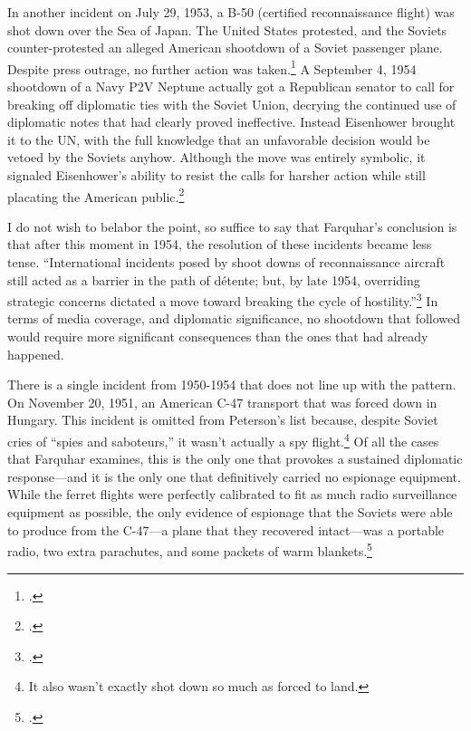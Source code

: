 \documentclass[12pt]{article}
\begin{document}
In another incident on July 29, 1953, a B-50 (certified reconnaissance flight) was shot down over the Sea of Japan. The United States protested, and the Soviets counter-protested an alleged American shootdown of a Soviet passenger plane. Despite press outrage, no further action was taken.\footcite[p.~47]{farquhar_aerial_2015} A September 4, 1954 shootdown of a Navy P2V Neptune actually got a Republican senator to call for breaking off diplomatic ties with the Soviet Union, decrying the continued use of diplomatic notes that had clearly proved ineffective. Instead Eisenhower brought it to the UN, with the full knowledge that an unfavorable decision would be vetoed by the Soviets anyhow. Although the move was entirely symbolic, it signaled Eisenhower's ability to resist the calls for harsher action while still placating the American public.\footcite[p.~47]{farquhar_aerial_2015}

I do not wish to belabor the point, so suffice to say that Farquhar's conclusion is that after this moment in 1954, the resolution of these incidents became less tense. ``International incidents posed by shoot downs of reconnaissance aircraft still acted as a barrier in the path of détente; but, by late 1954, overriding strategic concerns dictated a move toward breaking the cycle of hostility.''\footcite[p.~49]{farquhar_aerial_2015} In terms of media coverage, and diplomatic significance, no shootdown that followed would require more significant consequences than the ones that had already happened.

There is a single incident from 1950-1954 that does not line up with the pattern. On November 20, 1951, an American C-47 transport that was forced down in Hungary. This incident is omitted from Peterson's list because, despite Soviet cries of ``spies and saboteurs,'' it wasn't actually a spy flight.\footnote{It also wasn't exactly shot down so much as forced to land.} Of all the cases that Farquhar examines, this is the only one that provokes a sustained diplomatic response---and it is the only one that definitively carried no espionage equipment. While the ferret flights were perfectly calibrated to fit as much radio surveillance equipment as possible, the only evidence of espionage that the Soviets were able to produce from the C-47---a plane that they recovered intact---was a portable radio, two extra parachutes, and some packets of warm blankets.\footcite{the_united_press_soviet_1951}
\end{document}
